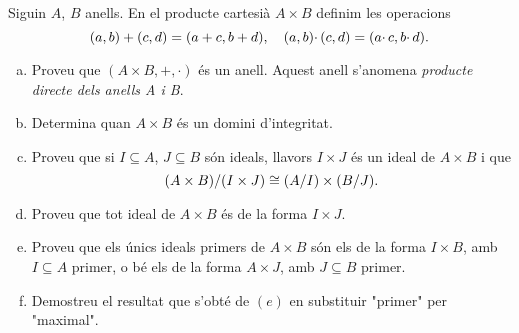 \documentclass[../main.tex]{subfiles}
\begin{document}
\setcounter{exercici}{13}
\begin{exercici}\label{esal14}
Siguin $A$, $B$ anells. En el producte cartesià $A\times B$ definim les operacions
\begin{equation}
        \notag
        (a,b)+(c,d)=(a+c,b+d), \quad (a,b)\cdotp (c,d) = (a\cdotp c, b\cdotp d).
\end{equation}
\begin{enumerate}[(a)]
        \item Proveu que $(A\times B,+,\cdotp )$ és un anell. Aquest anell s'anomena \textit{producte directe dels anells A i B}.
        \item Determina quan $A\times B$ és un domini d'integritat.
        \item Proveu que si $I\subseteq A$, $J\subseteq B$ són ideals, llavors $I\times J$ és un ideal de $A\times B$ i que
        \begin{equation}
            \notag
            (A\times B)/(I\times J) \cong (A/I)\times (B/J).
        \end{equation}
        \item Proveu que tot ideal de $A\times B$ és de la forma $I\times J$.
        \item Proveu que els únics ideals primers de $A\times B$ són els de la forma $I\times B$, amb $I\subseteq A$ primer, o bé els de la forma $A\times J$, amb $J\subseteq B$ primer.
        \item Demostreu el resultat que s'obté de $(e)$ en substituir "primer" per "maximal".
\end{enumerate}
\end{exercici}
\end{document}
